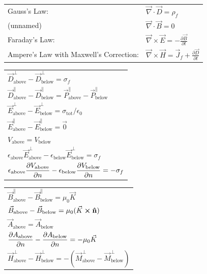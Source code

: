 \documentclass{article}
\newcommand{\ds}{\displaystyle}
\newcommand{\formbox}[2]{\begin{center} \begin{tcolorbox}[title = #1, boxrule=2pt,arc=3.4pt,boxsep=0mm] #2\end{tcolorbox}\end{center}}
\begin{document}
\begin{multicols*}{2}
{{\begin{tabular}{ m{12em} m{25em}  }
            Gauss's Law: & $\displaystyle \vec{\nabla} \cdot \vec{D} = \rho_f$\\
            (unnamed) & $\displaystyle \vec{\nabla} \cdot \vec{B} = 0$\\
            Faraday's Law: & $\displaystyle \vec{\nabla} \times \vec{E} = - \frac{\partial \vec{B}}{\partial t}$\\
            Ampere's Law with Maxwell's Correction: & $\displaystyle \vec{\nabla} \times \vec{H} = \vec{J}_f + \frac{\partial \vec{D}}{\partial t}$\\
        \end{tabular}}
    }
    \formbox{Boundary Conditions in Electrostatics}{
        {\renewcommand{\arraystretch}{1.75}%
        \begin{tabular}{ l }
            $\vec{D}_{\text{above}}^{\perp} - \vec{D}_{\text{below}}^{\perp}  = \sigma_f$\\
            $\vec{D}_{\text{above}}^{\parallel} - \vec{D}_{\text{below}}^{\parallel} = \vec{P}_{\text{above}}^{\parallel} - \vec{P}_{\text{below}}^{\parallel}$\\
            $\vec{E}_{\text{above}}^{\perp} - \vec{E}_{\text{below}}^{\perp}  = \sigma_{\text{tot}}/\epsilon_0$\\
            $\vec{E}_{\text{above}}^{\parallel} - \vec{E}_{\text{below}}^{\parallel}  = \vec{0}$\\
            $V_\text{above} = V_\text{below}$\\
            $\epsilon_\text{above}\vec{E}_\text{above}^\perp - \epsilon_\text{below}\vec{E}_\text{below}^\perp = \sigma_f$\\
            $\ds \epsilon_\text{above}\pdv{V_\text{above}}{n} - \epsilon_\text{below}\pdv{V_\text{below}}{n} = -\sigma_f$
        \end{tabular}}
    }
    \formbox{Boundary Conditions in Magnetostatics}{
        {\renewcommand{\arraystretch}{1.75}%
        \begin{tabular}{ l }
            $\vec{B}_\text{above}^\parallel - \vec{B}_\text{below}^\parallel = \mu_0\vec{K}$\\
            $\vec{B}_\text{above} - \vec{B}_\text{below} = \mu_0(\vec{K}\cross\vu{n})$\\
            $\vec{A}_\text{above} = \vec{A}_\text{below}$\\
            $\ds \pdv{A_\text{above}}{n} - \pdv{A_\text{below}}{n} = -\mu_0\vec{K}$\\
            $\vec{H}_\text{above}^\perp - \vec{H}_\text{below}^\perp = - (\vec{M}_\text{above}^\perp - \vec{M}_\text{below}^\perp) $\\

\end{tabular}}}
\end{multicols*}
\end{document}
